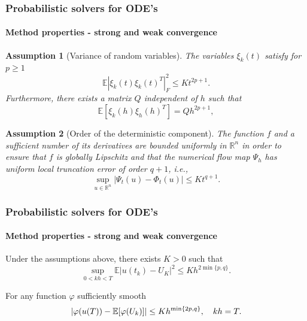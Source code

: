 \documentclass{beamer}
\newcommand{\R}{\mathbb{R}}
\newcommand{\E}{\mathbb{E}}
\newtheorem{assumption}{Assumption}
\renewcommand{\phi}{\varphi}
\begin{document}
\begin{frame}
	\frametitle{Probabilistic solvers for ODE's}
	\framesubtitle{Method properties - strong and weak convergence \cite{CGS16}}
	
	\begin{assumption}[Variance of random variables] The variables $\xi_k(t)$ satisfy for $p \geq 1$
		\begin{equation*}
			\E|\xi_k(t)\xi_k(t)^T|^2_F \leq Kt^{2p+1}.
		\end{equation*}
		Furthermore, there exists a matrix $Q$ independent of $h$ such that 
		\begin{equation*}
		\E[\xi_k(h)\xi_h(h)^T] = Qh^{2p+1},
		\end{equation*}
	\end{assumption}
		
	\begin{assumption}[Order of the deterministic component] The function $f$ and a sufficient number of its derivatives are bounded uniformly in $\R^n$ in order to ensure that $f$ is globally Lipschitz and that the numerical flow map $\Psi_h$ has uniform local truncation error of order $q + 1$, i.e., 
		\begin{equation*}
			\sup_{u\in\R^n} |\Psi_t(u) - \Phi_t(u)| \leq Kt^{q+1}.
		\end{equation*}
	\end{assumption}	
\end{frame}

\begin{frame}
	\frametitle{Probabilistic solvers for ODE's}
	\framesubtitle{Method properties - strong and weak convergence \cite{CGS16}}
	
	\begin{theorem} Under the assumptions above, there exists $K>0$ such that
		\begin{equation*}
		\sup_{0<kh<T} \E|u(t_k) - U_K|^2 \leq Kh^{2\min\{p,q\}}.
		\end{equation*}
	\end{theorem}
	
	\begin{theorem} For any function $\phi$ sufficiently smooth
		\begin{equation*}
		\abs{\phi(u(T)) - \E[\phi(U_k)]} \leq Kh^{\min\{2p, q\}}, \quad kh = T.
		\end{equation*}
	\end{theorem}
	
\end{frame}
\end{document}
